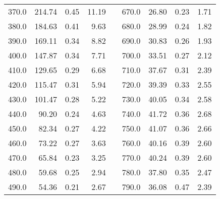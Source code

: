 \begin{table}[htbp]
\begin{center}
\begin{tabular}{|r|r|c|r|l|r|r|c|c|}
370.0 & 214.74 &  0.45 & 11.19 & & 670.0 & 26.80 &  0.23 &  1.71 \\ 
380.0 & 184.63 &  0.41 &  9.63 & & 680.0 & 28.99 &  0.24 &  1.82 \\ 
390.0 & 169.11 &  0.34 &  8.82 & & 690.0 & 30.83 &  0.26 &  1.93 \\ 
400.0 & 147.87 &  0.34 &  7.71 & & 700.0 & 33.51 &  0.27 &  2.12 \\ 
410.0 & 129.65 &  0.29 &  6.68 & & 710.0 & 37.67 &  0.31 &  2.39 \\ 
420.0 & 115.47 &  0.31 &  5.94 & & 720.0 & 39.39 &  0.33 &  2.55 \\ 
430.0 & 101.47 &  0.28 &  5.22 & & 730.0 & 40.05 &  0.34 &  2.58 \\ 
440.0 & 90.20 &  0.24 &  4.63 & & 740.0 & 41.72 &  0.36 &  2.68 \\ 
450.0 & 82.34 &  0.27 &  4.22 & & 750.0 & 41.07 &  0.36 &  2.66 \\ 
460.0 & 73.22 &  0.27 &  3.63 & & 760.0 & 40.16 &  0.39 &  2.60 \\ 
470.0 & 65.84 &  0.23 &  3.25 & & 770.0 & 40.24 &  0.39 &  2.60 \\ 
480.0 & 59.68 &  0.25 &  2.94 & & 780.0 & 37.80 &  0.35 &  2.47 \\ 
490.0 & 54.36 &  0.21 &  2.67 & & 790.0 & 36.08 &  0.47 &  2.39 \\ 
\cline{1-4} 
\cline{6-9} 
\end{tabular} 

\end{center} 
\end{table}
